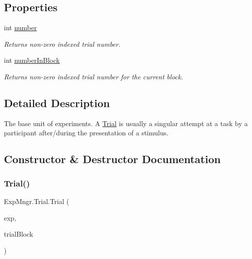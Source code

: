 \subsection*{Properties}
\begin{DoxyCompactItemize}
\item 
int \hyperlink{class_exp_mngr_1_1_trial_ad581be1a1aa77dbeb93ccd9721c1f8a2}{number}
\begin{DoxyCompactList}\small\item\em Returns non-\/zero indexed trial number. \end{DoxyCompactList}\item 
int \hyperlink{class_exp_mngr_1_1_trial_ad0730e34a2ae268037c3d396b8863921}{number\+In\+Block}
\begin{DoxyCompactList}\small\item\em Returns non-\/zero indexed trial number for the current block. \end{DoxyCompactList}\end{DoxyCompactItemize}


\subsection{Detailed Description}
The base unit of experiments. A \hyperlink{class_exp_mngr_1_1_trial}{Trial} is usually a singular attempt at a task by a participant after/during the presentation of a stimulus. 



\subsection{Constructor \& Destructor Documentation}
\mbox{\label{class_exp_mngr_1_1_trial_ad9a26c84544d95c3fbfd3344ef1ac46b}} 
\subsubsection{\texorpdfstring{Trial()}{Trial()}\hspace{0.1cm}{\footnotesize\ttfamily [1/2]}}
{\footnotesize\ttfamily Exp\+Mngr.\+Trial.\+Trial (\begin{DoxyParamCaption}\item[{\hyperlink{class_exp_mngr_1_1_experiment_session}{Experiment\+Session}}]{exp,  }\item[{\hyperlink{class_exp_mngr_1_1_block}{Block}}]{trial\+Block }\end{DoxyParamCaption})}



